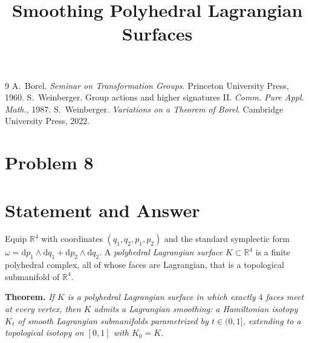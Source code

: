 \documentclass[11pt]{article}
\begin{document}
\begin{thebibliography}{9}
 A.~Borel.
  \emph{Seminar on Transformation Groups}. Princeton University Press, 1960.
 S.~Weinberger.
  Group actions and higher signatures II.
  \emph{Comm. Pure Appl. Math.}, 1987.
 S.~Weinberger.
  \emph{Variations on a Theorem of Borel}.
  Cambridge University Press, 2022.
\end{thebibliography}

\endgroup

\clearpage
\section*{Problem 8}
\begingroup
\hypersetup{colorlinks=true,
            linkcolor=blue!50!black,
            citecolor=blue!50!black,
            urlcolor=blue!50!black}
\newcommand{\qeightR}{\mathbb{R}}
\newcommand{\qeightSm}{\mathscr S}
\newcommand{\qeightLdual}{L^{\vee}}
\newcommand{\qeightdd}{\mathrm d}
\newcommand{\qeightLag}{\Lambda}
\newcommand{\qeightHess}{\operatorname{Hess}}
\newtheorem{qeighttheorem}{Theorem}
\newtheorem{qeightproposition}{Proposition}
\newtheorem{qeightlemma}{Lemma}
\newtheorem{qeightcorollary}{Corollary}
\theoremstyle{definition}
\newtheorem{qeightdefinition}{Definition}
\title{Smoothing Polyhedral Lagrangian Surfaces}
\author{}
\date{}
\maketitle


\section*{Statement and Answer}

Equip $\qeightR^4$ with coordinates $(q_1,q_2,p_1,p_2)$ and the standard symplectic
form $\omega=\qeightdd p_1\wedge \qeightdd q_1+\qeightdd p_2\wedge \qeightdd q_2$. A \emph{polyhedral
Lagrangian surface} $K\subset\qeightR^4$ is a finite polyhedral complex, all of whose
faces are Lagrangian, that is a topological submanifold of $\qeightR^4$.

\medskip
\noindent\textbf{Theorem.} \emph{If $K$ is a polyhedral Lagrangian surface in
which exactly $4$ faces meet at every vertex, then $K$ admits a Lagrangian
smoothing: a Hamiltonian isotopy $K_t$ of smooth Lagrangian submanifolds
parametrized by $t\in(0,1]$, extending to a topological isotopy on $[0,1]$ with
$K_0=K$.}
\end{document}
